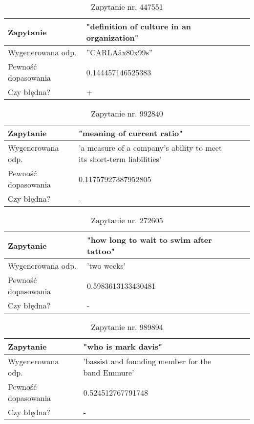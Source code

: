  \begin{table}[htp!]
\centering
\caption{Zapytanie nr. 447551\protect\footnotemark[2]}
\vspace*{5mm}
\begin{tabular}{llll}
   Zapytanie & "definition of culture in an organization"\\
   \hline
    Wygenerowana odp. & ''CARLAâx80x99s'' \\
    \hline
    Pewność dopasowania & 0.144457146525383\\
    \hline
    Czy błędna? & +\\
\end{tabular}
\end{table}

 \begin{table}[htp!]
\centering
\caption{Zapytanie nr. 992840\protect\footnotemark[2]}
\vspace*{5mm}
\begin{tabular}{llll}
   Zapytanie & "meaning of current ratio"\\
   \hline
    Wygenerowana odp. & 'a measure of a company's ability to meet its short-term liabilities' \\
    \hline
    Pewność dopasowania & 0.11757927387952805\\
    \hline
    Czy błędna? & -\\
\end{tabular}
\end{table}

\begin{table}[htp!]
\centering
\caption{Zapytanie nr. 272605\protect\footnotemark[2]}
\vspace*{5mm}
\begin{tabular}{llll}
   Zapytanie & "how long to wait to swim after tattoo"\\
   \hline
    Wygenerowana odp. & 'two weeks' \\
    \hline
    Pewność dopasowania & 0.5983613133430481\\
    \hline
    Czy błędna? & -\\
\end{tabular}
\end{table}

\begin{table}[htp!]
\centering
\caption{Zapytanie nr. 989894\protect\footnotemark[2]}
\vspace*{5mm}
\begin{tabular}{llll}
   Zapytanie & "who is mark davis"\\
   \hline
    Wygenerowana odp. & 'bassist and founding member for the band Emmure' \\
    \hline
    Pewność dopasowania & 0.524512767791748\\
    \hline
    Czy błędna? & -\\
\end{tabular}
\end{table}


